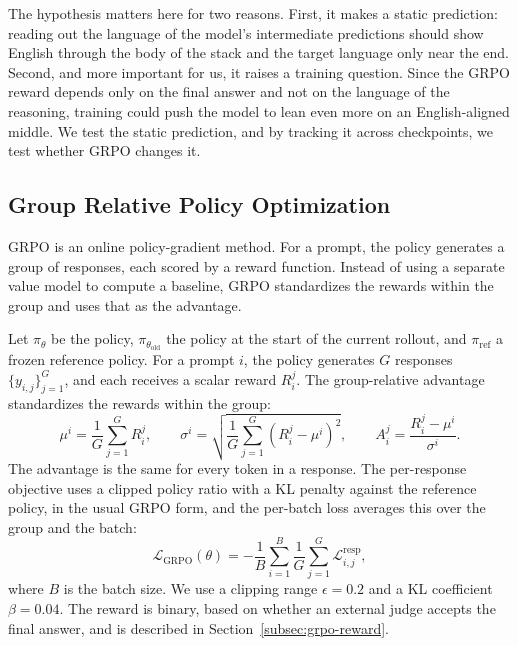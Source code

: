 The hypothesis matters here for two reasons. First, it makes a static prediction:
reading out the language of the model's intermediate predictions should show English
through the body of the stack and the target language only near the end. Second, and
more important for us, it raises a training question. Since the GRPO reward depends
only on the final answer and not on the language of the reasoning, training could
push the model to lean even more on an English-aligned middle. We test the static
prediction, and by tracking it across checkpoints, we test whether GRPO changes it.

\subsection{Group Relative Policy Optimization}
\label{subsec:grpo-objective}

GRPO \citep{shao2024deepseekmath} is an online policy-gradient method. For a prompt,
the policy generates a group of responses, each scored by a reward function. Instead
of using a separate value model to compute a baseline, GRPO standardizes the rewards
within the group and uses that as the advantage.

Let $\pi_\theta$ be the policy, $\pi_{\theta_{\text{old}}}$ the policy at the start
of the current rollout, and $\pi_{\text{ref}}$ a frozen reference policy. For a
prompt $i$, the policy generates $G$ responses $\{y_{i,j}\}_{j=1}^G$, and each
receives a scalar reward $R_i^j$. The group-relative advantage standardizes the
rewards within the group:
\begin{equation}
	\mu^i = \frac{1}{G} \sum_{j=1}^{G} R_i^j, \qquad
	\sigma^i = \sqrt{\frac{1}{G} \sum_{j=1}^{G} (R_i^j - \mu^i)^2}, \qquad
	A_i^j = \frac{R_i^j - \mu^i}{\sigma^i}.
	\label{eq:grpo-advantage}
\end{equation}
The advantage is the same for every token in a response. The per-response objective
uses a clipped policy ratio with a KL penalty against the reference policy, in the
usual GRPO form, and the per-batch loss averages this over the group and the batch:
\begin{equation}
	\mathcal{L}_{\text{GRPO}}(\theta) = -\frac{1}{B} \sum_{i=1}^{B} \frac{1}{G} \sum_{j=1}^{G} \mathcal{L}_{i,j}^{\text{resp}},
	\label{eq:grpo-loss}
\end{equation}
where $B$ is the batch size. We use a clipping range $\epsilon = 0.2$ and a KL
coefficient $\beta = 0.04$. The reward is binary, based on whether an external judge
accepts the final answer, and is described in Section~\ref{subsec:grpo-reward}.

